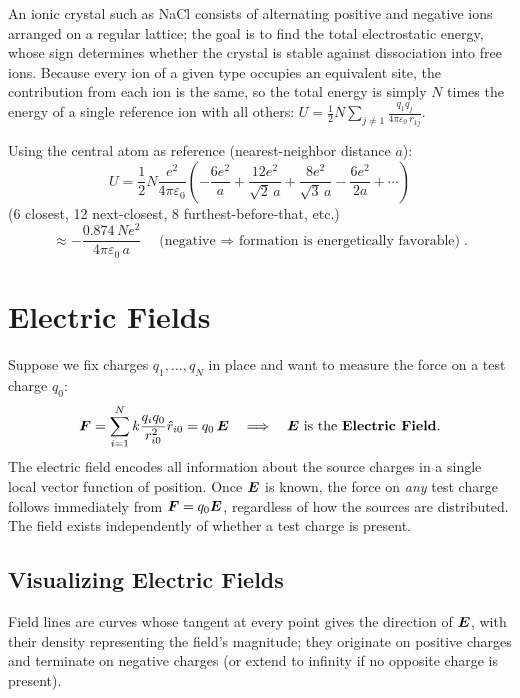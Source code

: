 An ionic crystal such as NaCl consists of alternating positive and negative ions arranged on a regular lattice; the goal is to find the total electrostatic energy, whose sign determines whether the crystal is stable against dissociation into free ions. Because every ion of a given type occupies an equivalent site, the contribution from each ion is the same, so the total energy is simply $N$ times the energy of a single reference ion with all others: $U = \frac{1}{2}N\displaystyle\sum_{j \neq 1} \frac{q_1 q_j}{4\pi\varepsilon_0\, r_{1j}}$.

Using the central atom as reference (nearest-neighbor distance $a$):
\[
    U = \frac{1}{2}N\frac{e^2}{4\pi\varepsilon_0}\left(-\frac{6e^2}{a} + \frac{12e^2}{\sqrt{2}\,a} + \frac{8e^2}{\sqrt{3}\,a} - \frac{6e^2}{2a} + \cdots\right)
\]
(6 closest, 12 next-closest, 8 furthest-before-that, etc.)
\[
    \approx -\frac{0.874\, Ne^2}{4\pi\varepsilon_0\, a} \quad\text{(negative $\Rightarrow$ formation is energetically favorable)}.
\]

\section{Electric Fields}

\begin{definition}
Suppose we fix charges $q_1,\ldots,q_N$ in place and want to measure the force on a test charge $q_0$:
\[
    \vect{F} = \sum_{i=1}^{N} k\frac{q_i q_0}{r_{i0}^2}\hat{r}_{i0}
    = q_0\,\vect{E} \quad \Longrightarrow \quad \vect{E} \text{ is the \textbf{Electric Field}.}
\]
The electric field encodes all information about the source charges in a single local vector function of position. Once $\vect{E}$ is known, the force on \emph{any} test charge follows immediately from $\vect{F} = q_0\vect{E}$, regardless of how the sources are distributed. The field exists independently of whether a test charge is present.
\end{definition}

\subsection{Visualizing Electric Fields}

Field lines are curves whose tangent at every point gives the direction of $\vect{E}$, with their density representing the field's magnitude; they originate on positive charges and terminate on negative charges (or extend to infinity if no opposite charge is present).

